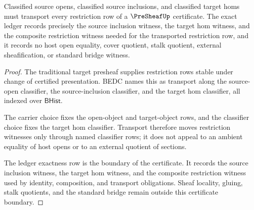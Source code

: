 \begin{theorem}\label{thm:presheaf-classifier-transport-ledger}
Classified source opens, classified source inclusions, and classified target homs must transport every restriction row of a $\PreSheafUp$ certificate. The exact ledger records precisely the source inclusion witness, the target hom witness, and the composite restriction witness needed for the transported restriction row, and it records no host open equality, cover quotient, stalk quotient, external sheafification, or standard bridge witness.
\end{theorem}
\begin{proof}
The traditional target presheaf supplies restriction rows stable under change of certified presentation. BEDC names this as transport along the source-open classifier, the source-inclusion classifier, and the target hom classifier, all indexed over $\mathsf{BHist}$.

The carrier choice fixes the open-object and target-object rows, and the classifier choice fixes the target hom classifier. Transport therefore moves restriction witnesses only through named classifier rows; it does not appeal to an ambient equality of host opens or to an external quotient of sections.

The ledger exactness row is the boundary of the certificate. It records the source inclusion witness, the target hom witness, and the composite restriction witness used by identity, composition, and transport obligations. Sheaf locality, gluing, stalk quotients, and the standard bridge remain outside this certificate boundary.
\end{proof}

